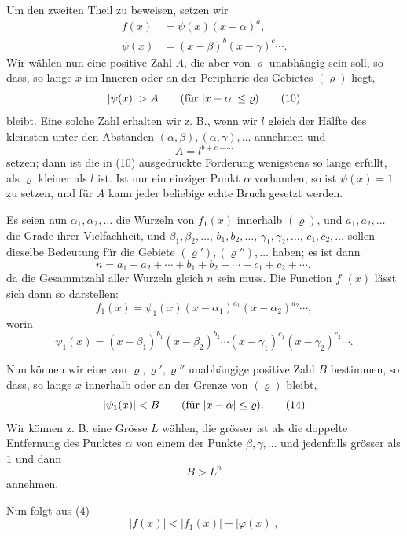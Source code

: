 
Um den zweiten Theil zu beweisen, setzen wir
\begin{align}
 f(x)&=\psi(x)(x-\alpha)^a,
\tag{8}\\
 \psi(x)&=(x-\beta)^b(x-\gamma)^c\cdots .
\tag{9}
\end{align}
Wir wählen nun eine positive Zahl $A$, die aber von $\varrho$ unabhängig sein soll, so dass, so lange $x$ im Inneren oder an der Peripherie des Gebietes $(\varrho)$ liegt,
\begin{equation}
 |\psi(x)|>A \qquad (\hbox{für } |x-\alpha|\le \varrho)
\tag{10}
\end{equation}
bleibt. Eine solche Zahl erhalten wir z. B., wenn wir $l$ gleich der Hälfte des kleinsten unter den Abständen $(\alpha,\beta),(\alpha,\gamma),\ldots$ annehmen und
\[
 A=l^{b+c+\cdots}
\]
setzen; dann ist die in (10) ausgedrückte Forderung wenigstens so lange erfüllt, als $\varrho$ kleiner als $l$ ist. Ist nur ein einziger Punkt $\alpha$ vorhanden, so ist $\psi(x)=1$ zu setzen, und für $A$ kann jeder beliebige echte Bruch gesetzt werden.

Es seien nun $\alpha_1,\alpha_2,
\ldots$ die Wurzeln von $f_1(x)$ innerhalb $(\varrho)$, und $a_1,a_2,
\ldots$ die Grade ihrer Vielfachheit, und $\beta_1,\beta_2,
\ldots$, $b_1,b_2,
\ldots$, $\gamma_1,\gamma_2,
\ldots$, $c_1,c_2,
\ldots$ sollen dieselbe Bedeutung für die Gebiete $(\varrho'),(\varrho''),\ldots$ haben; es ist dann
\begin{equation}
 n=a_1+a_2+
\cdots+b_1+b_2+\cdots+c_1+c_2+\cdots,
\tag{11}
\end{equation}
da die Gesammtzahl aller Wurzeln gleich $n$ sein muss. Die Function $f_1(x)$ lässt sich dann so darstellen:
\begin{equation}
 f_1(x)=\psi_1(x)(x-\alpha_1)^{a_1}(x-\alpha_2)^{a_2}\cdots,
\tag{12}
\end{equation}
worin
\begin{equation}
 \psi_1(x)=(x-\beta_1)^{b_1}(x-\beta_2)^{b_2}\cdots
          (x-\gamma_1)^{c_1}(x-\gamma_2)^{c_2}\cdots .
\tag{13}
\end{equation}

Nun können wir eine von $\varrho,\varrho',\varrho''$ unabhängige positive Zahl $B$ bestimmen, so dass, so lange $x$ innerhalb oder an der Grenze von $(\varrho)$ bleibt,
\begin{equation}
 |\psi_1(x)|<B \qquad (\hbox{für } |x-\alpha|\le \varrho).
\tag{14}
\end{equation}
Wir können z. B. eine Grösse $L$ wählen, die grösser ist als die doppelte Entfernung des Punktes $\alpha$ von einem der Punkte $\beta,\gamma,
\ldots$ und jedenfalls grösser als $1$ und dann
\[
 B>L^n
\]
annehmen.

Nun folgt aus (4)
\begin{equation}
 |f(x)|<|f_1(x)|+|\varphi(x)|,
\tag{15}
\end{equation}
